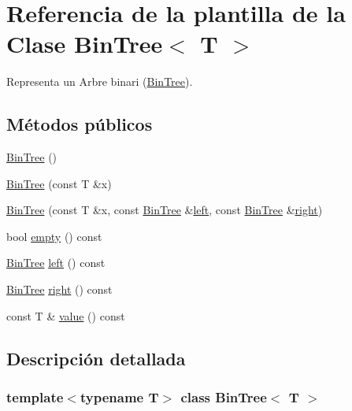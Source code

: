 \hypertarget{class_bin_tree}{}\section{Referencia de la plantilla de la Clase Bin\+Tree$<$ T $>$}
\label{class_bin_tree}


Representa un Arbre binari (\mbox{\hyperlink{class_bin_tree}{Bin\+Tree}}).  


\subsection*{Métodos públicos}
\begin{DoxyCompactItemize}
\item 
\mbox{\hyperlink{class_bin_tree_a47eef22d29cd023449d97c073c08e5b6}{Bin\+Tree}} ()
\item 
\mbox{\hyperlink{class_bin_tree_a1ab686e0bcf990093ff91fe71744c1a4}{Bin\+Tree}} (const T \&x)
\item 
\mbox{\hyperlink{class_bin_tree_adb7eeff76d08130c943b36af215eb521}{Bin\+Tree}} (const T \&x, const \mbox{\hyperlink{class_bin_tree}{Bin\+Tree}} \&\mbox{\hyperlink{class_bin_tree_a82108db4c1b08d1f111027788c196d4e}{left}}, const \mbox{\hyperlink{class_bin_tree}{Bin\+Tree}} \&\mbox{\hyperlink{class_bin_tree_aff8e96651b27284c329667b5ad3e4d0b}{right}})
\item 
bool \mbox{\hyperlink{class_bin_tree_a74cda259ba5c25b8ee38ed4dc33e4fad}{empty}} () const
\item 
\mbox{\hyperlink{class_bin_tree}{Bin\+Tree}} \mbox{\hyperlink{class_bin_tree_a82108db4c1b08d1f111027788c196d4e}{left}} () const
\item 
\mbox{\hyperlink{class_bin_tree}{Bin\+Tree}} \mbox{\hyperlink{class_bin_tree_aff8e96651b27284c329667b5ad3e4d0b}{right}} () const
\item 
const T \& \mbox{\hyperlink{class_bin_tree_a734e785b089c87b49187ee7c58edf5f3}{value}} () const
\end{DoxyCompactItemize}


\subsection{Descripción detallada}
\subsubsection*{template$<$typename T$>$\newline
class Bin\+Tree$<$ T $>$}

